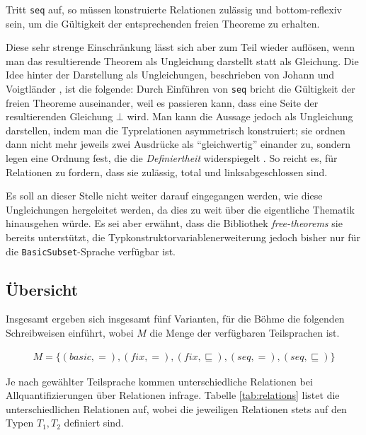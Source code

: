 Tritt \texttt{seq} auf, so müssen konstruierte Relationen zulässig und bottom-reflexiv sein, um die Gültigkeit der
entsprechenden freien Theoreme zu erhalten.

Diese sehr strenge Einschränkung lässt sich aber zum Teil wieder auflösen, wenn man das resultierende Theorem als
Ungleichung darstellt statt als Gleichung.
Die Idee hinter der Darstellung als Ungleichungen, beschrieben von Johann und Voigtländer \cite{johann}, ist die folgende: Durch Einführen von \texttt{seq} bricht die Gültigkeit der
freien Theoreme auseinander, weil es passieren kann, dass eine Seite der resultierenden Gleichung $\bot$ wird.
Man kann die Aussage jedoch als Ungleichung darstellen, indem man die Typrelationen asymmetrisch konstruiert; sie
ordnen dann nicht mehr jeweils zwei Ausdrücke als ``gleichwertig'' einander zu, sondern legen eine Ordnung fest, die
die \textit{Definiertheit} widerspiegelt \cite{johann}.
So reicht es, für Relationen zu fordern, dass sie zulässig, total und linksabgeschlossen sind.

Es soll an dieser Stelle nicht weiter darauf eingegangen werden, wie diese Ungleichungen hergeleitet werden, da dies zu weit
über die eigentliche Thematik hinausgehen würde. Es sei aber erwähnt, dass die Bibliothek \textit{free-theorems} sie bereits
unterstützt, die Typkonstruktorvariablenerweiterung jedoch bisher nur für die \texttt{BasicSubset}-Sprache verfügbar ist.


\subsection{Übersicht}

Insgesamt ergeben sich insgesamt fünf Varianten, für die Böhme \cite{freetheorems} die folgenden Schreibweisen einführt,
wobei $M$ die Menge der verfügbaren Teilsprachen ist.

\begin{align*}
M = \{(basic, =), (fix, =), (fix, \sqsubseteq), (seq, =), (seq, \sqsubseteq)\}
\end{align*}

Je nach gewählter Teilsprache kommen unterschiedliche Relationen bei Allquantifizierungen über Relationen infrage. Tabelle
\ref{tab:relations} listet die unterschiedlichen Relationen auf, wobei die jeweiligen Relationen
stets auf den Typen $T_1, T_2$ definiert sind.

